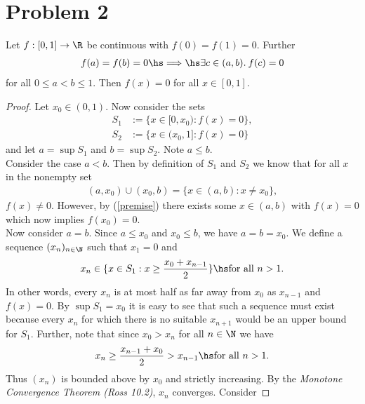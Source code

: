 \documentclass{article}
\begin{document}
\section*{Problem 2}

\begin{claim*}
    Let $f:[0,1]\to\R$ be continuous with $f(0)=f(1)=0$. Further
    \begin{align}
        \label{premise}
        f(a)=f(b)=0 \hs\Longrightarrow\hs \exists c\in(a,b).\: f(c)=0
    \end{align}
    for all $0\leq a<b\leq 1$. Then $f(x)=0$ for all $x\in[0,1]$.
\end{claim*}

\begin{proof}
    Let $x_0\in(0,1)$. Now consider the sets
    \begin{align*}
        S_1 &:= \{x\in[0,x_0) : f(x) = 0\},\\
        S_2 &:= \{x\in(x_0,1] : f(x) = 0\}
    \end{align*}
    and let $a=\sup S_1$ and $b=\sup S_2$. Note $a\leq b$.\\
    \indent Consider the case $a<b$. Then by definition of $S_1$ and $S_2$
    we know that for all $x$ in the nonempty set
    \begin{align*}
        (a,x_0)\cup(x_0,b)=\{x\in(a,b):x\not=x_0\},
    \end{align*}
    $f(x)\not=0$.
    However, by (\ref{premise}) there exists some $x\in(a,b)$ with $f(x)=0$
    which now implies $f(x_0)=0$.\\
    \indent Now consider $a=b$. Since $a\leq x_0$ and $x_0\leq b$, we have 
    $a=b=x_0$. We define a sequence $(x_n)_{n\in\N}$ such that $x_1=0$ and
    \begin{align*}
        x_n \in\{x\in S_1 : x\geq \frac{x_0+x_{n-1}}{2}\} \hs\text{for all }n>1.
    \end{align*}
    In other words, every $x_n$ is at most half as far away from $x_0$ 
    as $x_{n-1}$ and $f(x)=0$. By $\sup S_1 = x_0$ it is easy to see that such
    a sequence must exist because every $x_n$ for which there is no suitable
    $x_{n+1}$ would be an upper bound for $S_1$. Further, note that since $x_0>x_n$
    for all $n\in\N$ we have
    \begin{align*}
        x_n \geq \frac{x_{n-1}+x_0}{2} > x_{n-1} \hs\text{for all }n>1.
    \end{align*}
    Thus $(x_n)$ is bounded above by $x_0$ and strictly increasing. By the
    \emph{Monotone Convergence Theorem (Ross 10.2)}, $x_n$ converges. Consider

\end{proof}
\end{document}
